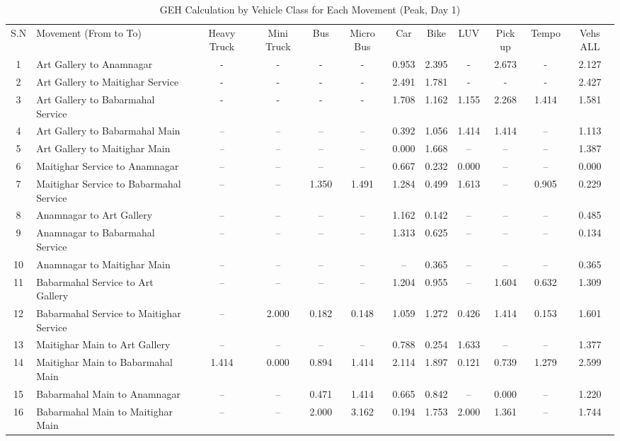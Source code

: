\begin{landscape}
\begin{table}[h!]
\centering
\caption{GEH Calculation by Vehicle Class for Each Movement (Peak, Day 1)}
\small
\setlength{\tabcolsep}{5pt}

\begin{tabular}{|c|p{6cm}|c|c|c|c|c|c|c|c|c|c|}
\hline
S.N& Movement (From to To)& Heavy Truck & Mini Truck & Bus & Micro Bus & Car & Bike & LUV & Pick up & Tempo & Vehs ALL \\
1	&Art Gallery to Anamnagar&	-&	-&	-&	-&	0.953&	2.395&	-&	2.673&	-&	2.127 \\ \hline
2	&Art Gallery to Maitighar Service	&-	&-	&-	&-	&2.491	&1.781	&-	&-	&-	&2.427 \\ \hline
3	&Art Gallery to Babarmahal Service	&-	&-	&-	&-	&1.708	&1.162	&1.155	&2.268	&1.414	&1.581 \\ \hline
4	&Art Gallery to Babarmahal Main	&–	&–	&–	&–	&0.392	&1.056	&1.414	&1.414	&–	&1.113 \\ \hline
5	&Art Gallery to Maitighar Main	&–	&–	&–	&–	&0.000	&1.668	&–	&–	&–	&1.387 \\ \hline
6	&Maitighar Service to Anamnagar	&–	&–	&–	&–	&0.667	&0.232	&0.000	&–	&–	&0.000 \\ \hline
7	&Maitighar Service to Babarmahal Service	&–	&–	&1.350	&1.491	&1.284	&0.499	&1.613	&–	&0.905	&0.229 \\ \hline
8	&Anamnagar to Art Gallery	&–	&–	&–	&–	&1.162	&0.142	&–	&–	&–	&0.485 \\ \hline
9	&Anamnagar to Babarmahal Service	&–	&–	&–	&–	&1.313	&0.625	&–	&–	&–	&0.134 \\ \hline
10	&Anamnagar to Maitighar Main	&–	&–	&–	&–	&–	&0.365	&–	&–	&–	&0.365 \\ \hline
11	&Babarmahal Service to Art Gallery	&–	&–	&–	&–	&1.204	&0.955	&–	&1.604	&0.632	&1.309 \\ \hline
12	&Babarmahal Service to Maitighar Service	&–	&2.000	&0.182	&0.148	&1.059	&1.272	&0.426	&1.414	&0.153	&1.601 \\ \hline
13	&Maitighar Main to Art Gallery	&–	&–	&–	&–	&0.788	&0.254	&1.633	&–	&–	&1.377 \\ \hline
14	&Maitighar Main to Babarmahal Main	&1.414	&0.000	&0.894	&1.414	&2.114	&1.897	&0.121	&0.739	&1.279	&2.599 \\ \hline
15	&Babarmahal Main to Anamnagar	&–	&–	&0.471	&1.414	&0.665	&0.842	&–	&0.000	&–	&1.220 \\ \hline
16	&Babarmahal Main to Maitighar Main	&–	&–	&2.000	&3.162	&0.194	&1.753	&2.000	&1.361	&–	&1.744 \\ \hline


\end{tabular}
\end{table}
\end{landscape}


